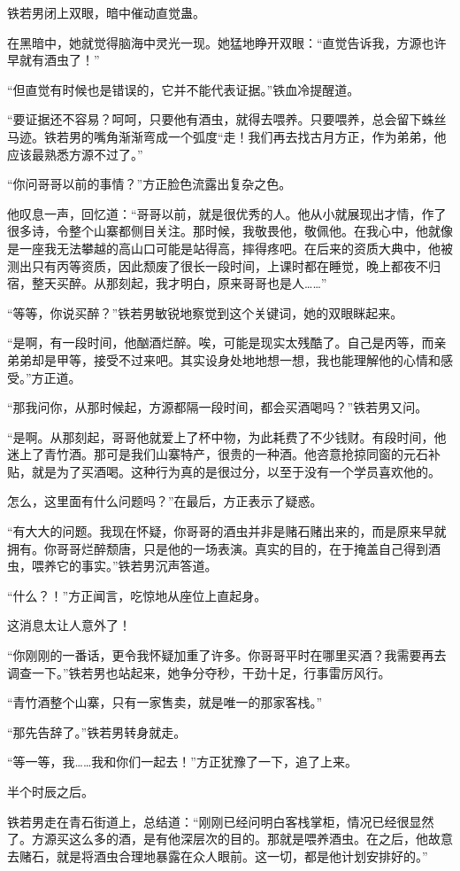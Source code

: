\begin{this_body}
铁若男闭上双眼，暗中催动直觉蛊。

在黑暗中，她就觉得脑海中灵光一现。她猛地睁开双眼：“直觉告诉我，方源也许早就有酒虫了！”

“但直觉有时候也是错误的，它并不能代表证据。”铁血冷提醒道。

“要证据还不容易？呵呵，只要他有酒虫，就得去喂养。只要喂养，总会留下蛛丝马迹。铁若男的嘴角渐渐弯成一个弧度“走！我们再去找古月方正，作为弟弟，他应该最熟悉方源不过了。”

“你问哥哥以前的事情？”方正脸色流露出复杂之色。

他叹息一声，回忆道：“哥哥以前，就是很优秀的人。他从小就展现出才情，作了很多诗，令整个山寨都侧目关注。那时候，我敬畏他，敬佩他。在我心中，他就像是一座我无法攀越的高山口可能是站得高，摔得疼吧。在后来的资质大典中，他被测出只有丙等资质，因此颓废了很长一段时间，上课时都在睡觉，晚上都夜不归宿，整天买醉。从那刻起，我才明白，原来哥哥也是人……”

“等等，你说买醉？”铁若男敏锐地察觉到这个关键词，她的双眼眯起来。

“是啊，有一段时间，他酗酒烂醉。唉，可能是现实太残酷了。自己是丙等，而亲弟弟却是甲等，接受不过来吧。其实设身处地地想一想，我也能理解他的心情和感受。”方正道。

“那我问你，从那时候起，方源都隔一段时间，都会买酒喝吗？”铁若男又问。

“是啊。从那刻起，哥哥他就爱上了杯中物，为此耗费了不少钱财。有段时间，他迷上了青竹酒。那可是我们山寨特产，很贵的一种酒。他咨意抢掠同窗的元石补贴，就是为了买酒喝。这种行为真的是很过分，以至于没有一个学员喜欢他的。

怎么，这里面有什么问题吗？”在最后，方正表示了疑惑。

“有大大的问题。我现在怀疑，你哥哥的酒虫并非是赌石赌出来的，而是原来早就拥有。你哥哥烂醉颓唐，只是他的一场表演。真实的目的，在于掩盖自己得到酒虫，喂养它的事实。”铁若男沉声答道。

“什么？！”方正闻言，吃惊地从座位上直起身。

这消息太让人意外了！

“你刚刚的一番话，更令我怀疑加重了许多。你哥哥平时在哪里买酒？我需要再去调查一下。”铁若男也站起来，她争分夺秒，干劲十足，行事雷厉风行。

“青竹酒整个山寨，只有一家售卖，就是唯一的那家客栈。”

“那先告辞了。”铁若男转身就走。

“等一等，我……我和你们一起去！”方正犹豫了一下，追了上来。

半个时辰之后。

铁若男走在青石街道上，总结道：“刚刚已经问明白客栈掌柜，情况已经很显然了。方源买这么多的酒，是有他深层次的目的。那就是喂养酒虫。在之后，他故意去赌石，就是将酒虫合理地暴露在众人眼前。这一切，都是他计划安排好的。”


\end{this_body}
